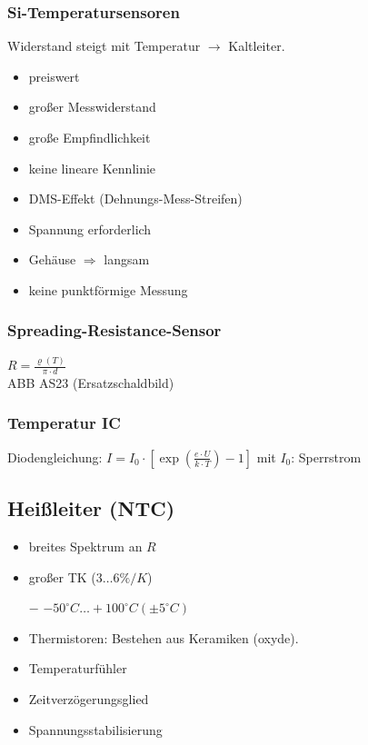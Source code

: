 \subsubsection{Si-Temperatursensoren}
Widerstand steigt mit Temperatur $\to$ Kaltleiter.
\begin{itemize}[label=$+$]
\item preiswert
\item großer Messwiderstand
\item große Empfindlichkeit
\end{itemize}
\begin{itemize}[label=$-$]
\item keine lineare Kennlinie
\item DMS-Effekt (Dehnungs-Mess-Streifen)
\item Spannung erforderlich
\item Gehäuse $\Rightarrow$ langsam
\item keine punktförmige Messung
\end{itemize}

\subsubsection{Spreading-Resistance-Sensor}
$R=\frac{\varrho(T)}{\pi \cdot d}$\\
ABB AS23 (Ersatzschaldbild)

\subsubsection{Temperatur IC}
Diodengleichung: $I=I_0\cdot \left[ \exp\left(\frac{e \cdot U}{k \cdot T}\right) -1 \right]$ mit $I_0$: Sperrstrom

\subsection{Heißleiter (NTC)}
\begin{itemize}[label=$+$]
\item breites Spektrum an $R$
\item großer TK ($3 \dots 6 \% /K$)
\item[$-$] $-50^\circ C \dots +100^\circ C (\pm 5^\circ C)$
\end{itemize}
\begin{itemize}
\item Thermistoren: Bestehen aus Keramiken (oxyde).
\item Temperaturfühler
\item Zeitverzögerungsglied
\item Spannungsstabilisierung
\end{itemize}

